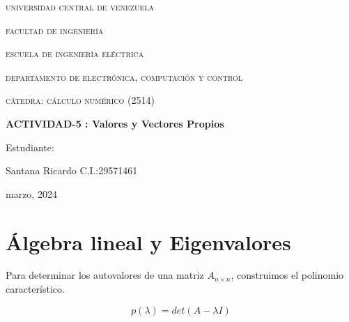 \documentclass[12pt, a4paper]{article}
\numberwithin{subsection}{section} %
\begin{document}
    \begin{titlepage}
        \centering
        {\scshape\Large universidad central de venezuela \par}
        {\scshape\Large facultad de ingeniería \par}
        {\scshape\Large escuela de ingeniería eléctrica \par}
        {\scshape\Large departamento de electrónica, computación y control \par}
        {\scshape\Large cátedra: cálculo numérico (2514) \par}

        \vspace{6cm}
        {\Large\bfseries ACTIVIDAD-5 : Valores y Vectores Propios\par}
        \vspace{6cm}

        \vfill

        \begin{flushright}
            Estudiante:\par
            Santana Ricardo C.I.:29571461
            \vspace{1cm}  
        \end{flushright}
        \vfill

        {\large marzo, 2024 \par}
    \end{titlepage}

    \begin{abstract}
    
        El escrito a presentar contiene los conocimientos mínimos necesarios para discutir y profundizar, en clase, de los temas: Autovalores y autovectores, y el método de potencia.
    
    \end{abstract}%
    
    \section{\textnormal{Álgebra lineal y Eigenvalores}} %
    
        Para determinar los autovalores de una matriz $ A _{n\times n} $, construimos el polinomio característico.
        
        \begin{equation}
        p \left( \lambda \right) = det \left( A - \lambda I \right)
        \end{equation}
        
\end{document}
